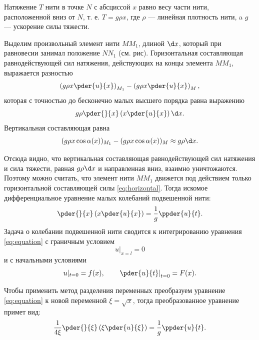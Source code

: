 Натяжение \( T \) нити в точке \( N \) с абсциссой \( x \) равно весу
части нити, расположенной вниз от \( N \), т. е. \( T = g\rho x \), где \( \rho \) --- линейная
плотность нити, a \( g \) --- ускорение силы тяжести.

Выделим произвольный элемент нити \( MM_1 \), длиной \( \d x \), который при
равновесии занимал положение \( NN_1 \) (см. рис). Горизонтальная составляющая
равнодействующей сил натяжения, действующих на концы элемента \( MM_1 \),
выражается разностью
\[
    \left(g\rho x\pder{u}{x}\right)_{M_1} - \left(g\rho x\pder{u}{x}\right)_M,
\]
которая с точностью до бесконечно малых высшего порядка равна выражению
\begin{equation}
    g\rho\pder{}{x}\left(x\pder{u}{x}\right)\d x.
    \label{eq:horizontal}
\end{equation}
Вертикальная составляющая равна
\[
    (g\rho x\cos\alpha(x))_{M_1} - (g\rho x\cos\alpha(x))_M \approx g\rho\d x.
\]

Отсюда видно, что вертикальная составляющая равнодействующей сил натяжения
и сила тяжести, равная \( g\rho\d x \) и направленная вниз, взаимно уничтожаются.
Поэтому можно считать, что элемент нити \( MM_1 \) движется под действием
только горизонтальной составляющей силы \eqref{eq:horizontal}. Тогда
искомое дифференциальное уравнение малых колебаний подвешенной нити:
\begin{equation}
    \pder{}{x}\left(x\pder{u}{x}\right) = \frac{1}{g}\ppder{u}{t}.
    \label{eq:equation}
\end{equation}
Задача о колебании подвешенной нити сводится к интегрированию уравнения
\eqref{eq:equation} с граничным условием
\begin{equation}
    u|_{x = l} = 0
    \label{condition_corner}
\end{equation}
и с начальными условиями
\begin{equation}
    u|_{t = 0} = f(x), \hspace{2em} \left.\pder{u}{t}\right|_{t = 0} = F(x).
    \label{condition_zero}
\end{equation}

Чтобы применить метод разделения переменных преобразуем уравнение
\eqref{eq:equation} к новой переменной \( \xi = \sqrt{x} \), тогда преобразованное
уравнение примет вид:
\begin{equation}
    \frac{1}{4\xi}\pder{}{\xi}\left(\xi\pder{u}{\xi}\right) = \frac{1}{g}\ppder{u}{t}.
    \label{eq:eq_xi}
\end{equation}

